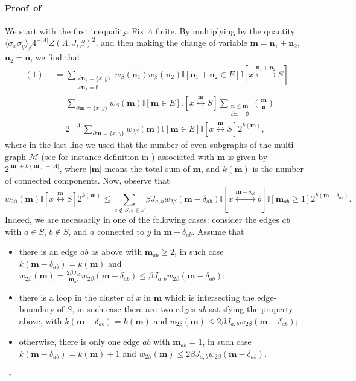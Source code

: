 \documentclass[a4paper,oneside,11pt]{article}
\newcommand{\be}[1]{\begin{equation}\label{#1}}
\newcommand{\ee}{\end{equation}}
\numberwithin{equation}{section}
\numberwithin{equation}{section}
\numberwithin{equation}{section}
\newenvironment{proof}[1][\relax]%
  {\paragraph{Proof\ifx#1\relax\else~of #1\fi}}%
  {~\hfill$\square$\par\bigskip}
\newcommand{\calM}{\mathcal{M}}
\def\be{\begin{equation}}
\def\ee{\end{equation}}
\newcommand{\n}{\mathbf{n}}
\newcommand{\m}{\mathbf m}
\begin{document}
\begin{proof}
We start with the first inequality. Fix $\Lambda$ finite. By multiplying by the quantity $\langle\sigma_x\sigma_y\rangle_{\beta}4^{-|\Lambda|} Z(\Lambda,J,\beta)^2$, and then making the change of variable $\m=\n_1+\n_2$, $\n_2=\n$, we find that 
\begin{align}(1):&=\sum_{\substack{\partial\n_1=\{x,y\}\\ \partial\n_2=\emptyset}}w_\beta(\n_1)w_\beta(\n_2)\mathbb I[\n_1+\n_2\in E] \mathbb I[x\stackrel{\n_1+\n_2}{\longleftrightarrow}S]\nonumber\\
&=\sum_{\partial\m=\{x,y\}}w_\beta(\m) \mathbb I[\m\in E] \mathbb I[x\stackrel{\m}{\longleftrightarrow}S]\sum_{\substack{\n\le\m\\\partial\n=\emptyset}}\binom{\m}{\n}\nonumber\\
&=2^{-|\Lambda|}\sum_{\partial\m=\{x,y\}}w_{2\beta}(\m)\mathbb I[\m\in E] \mathbb I[x\stackrel{\m}{\longleftrightarrow}S]2^{k(\m)},\end{align}
where in the last line we used that the number of even subgraphs of the multi-graph $\calM$ (see for instance definition in \cite{AizDumTasWar18}) associated with $\m$ is given by $2^{|\m|+k(\m)-|\Lambda|}$, where $|\m|$ means the total sum of $\m$, and $k(\m)$ is the number of connected components. Now, observe that \be
w_{2\beta}(\m)\mathbb I[x\stackrel{\m}{\longleftrightarrow}S]2^{k(\m)}\le \sum_{a\notin S,b\in S}\beta J_{a,b}w_{2\beta}(\m-\delta_{ab})\mathbb I[x\stackrel{\m-\delta_{ab}}{\longleftrightarrow}b]\mathbb I[\m_{ab}\ge1]2^{k(\m-\delta_{ab})}.
\ee
Indeed, we are necessarily in one of the following cases: consider the edges $ab$ with $a\in S$, $b\notin S$, and $a$ connected to $y$ in $\m-\delta_{ab}$. Assume that 
\begin{itemize}[noitemsep]
\item there is an edge $ab$ as above with $\m_{ab}\ge 2$, in such case $k(\m-\delta_{ab})=k(\m)$ and $w_{2\beta}(\m)=\frac{2\beta J_{ab}}{\m_{ab}}w_{2\beta}(\m-\delta_{ab})\le \beta J_{a,b} w_{2\beta}(\m-\delta_{ab})$;
\item there is a loop in the cluster of $x$ in $\m$ which is intersecting the edge-boundary of $S$, in such case there are two edges $ab$ satisfying the property above, with $k(\m-\delta_{ab})=k(\m)$ and $w_{2\beta}(\m)\le 2\beta J_{a,b} w_{2\beta}(\m-\delta_{ab})$;
\item otherwise, there is only one edge $ab$ with $\m_{ab}=1$, in such case $k(\m-\delta_{ab})=k(\m)+1$ and $w_{2\beta}(\m)\le 2\beta J_{a,b}w_{2\beta}(\m-\delta_{ab})$.

\end{itemize}
\end{proof}
\end{document}
